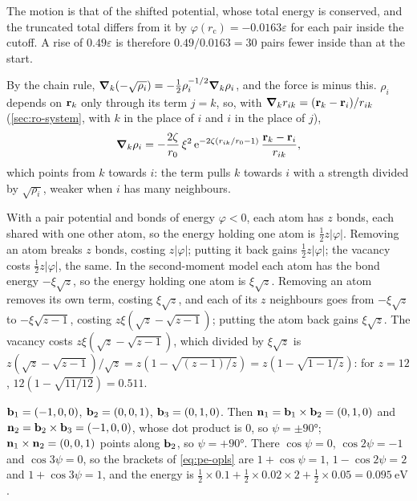 The motion is that of the shifted potential,
whose total energy is conserved, and the truncated total differs from it
by $\varphi(r_{\mathrm c}) = -0.0163\varepsilon$ for each pair inside the
cutoff. A rise of $0.49\varepsilon$ is therefore $0.49/0.0163 = 30$ pairs
fewer inside than at the start.

By the chain rule, $\bm{\nabla}_k(-\sqrt{\rho_i}) =
-\frac12\rho_i^{-1/2}\bm{\nabla}_k\rho_i$, and the force is minus this.
$\rho_i$ depends on $\bm{\mathrm{r}}_k$ only through its term $j = k$, so, with
$\bm{\nabla}_k r_{ik} = (\bm{\mathrm{r}}_k - \bm{\mathrm{r}}_i)/r_{ik}$ (\cref{sec:ro-system},
with $k$ in the place of $i$ and $i$ in the place of $j$),
\begin{equation*}
   \bm{\nabla}_k\rho_i = -\frac{2\zeta}{r_0}\,\xi^2\,\mathrm{e}^{-2\zeta(r_{ik}/r_0 - 1)}
   \,\frac{\bm{\mathrm{r}}_k - \bm{\mathrm{r}}_i}{r_{ik}} ,
\end{equation*}
which points from $k$ towards $i$: the term pulls $k$ towards $i$ with a
strength divided by $\sqrt{\rho_i}$, weaker when $i$ has many neighbours.

With a pair potential and bonds of energy
$\varphi < 0$, each atom has $z$ bonds, each shared with one other atom,
so the energy holding one atom is $\frac12 z\lvert\varphi\rvert$. Removing
an atom breaks $z$ bonds, costing $z\lvert\varphi\rvert$; putting it back
gains $\frac12 z\lvert\varphi\rvert$; the vacancy costs $\frac12 z\lvert
\varphi\rvert$, the same. In the second-moment model each atom has the
bond energy $-\xi\sqrt{z}$, so the energy holding one atom is $\xi\sqrt
z$. Removing an atom removes its own term, costing $\xi\sqrt z$, and each
of its $z$ neighbours goes from $-\xi\sqrt z$ to $-\xi\sqrt{z - 1}$,
costing $z\xi(\sqrt z - \sqrt{z - 1})$; putting the atom back gains $\xi
\sqrt z$. The vacancy costs $z\xi(\sqrt z - \sqrt{z - 1})$, which divided
by $\xi\sqrt z$ is $z(\sqrt z - \sqrt{z - 1})/\sqrt z = z(1 - \sqrt{(z -
1)/z}) = z(1 - \sqrt{1 - 1/z})$: for $z = 12$, $12(1 -
\sqrt{11/12}) = 0.511$.

$\bm{\mathrm{b}}_1 = (-1, 0, 0)$, $\bm{\mathrm{b}}_2 = (0, 0,
1)$, $\bm{\mathrm{b}}_3 = (0, 1, 0)$. Then $\bm{\mathrm{n}}_1 = \bm{\mathrm{b}}_1\times\bm{\mathrm{b}}_2 = (0,
1, 0)$ and $\bm{\mathrm{n}}_2 = \bm{\mathrm{b}}_2\times\bm{\mathrm{b}}_3 = (-1, 0, 0)$, whose dot
product is 0, so $\psi = \pm\ang{90}$; $\bm{\mathrm{n}}_1\times\bm{\mathrm{n}}_2 = (0, 0,
1)$ points along $\bm{\mathrm{b}}_2$, so $\psi = +\ang{90}$. There $\cos\psi = 0$,
$\cos2\psi = -1$ and $\cos3\psi = 0$, so the brackets of
\cref{eq:pe-opls} are $1 + \cos\psi = 1$, $1 - \cos2\psi = 2$ and $1 +
\cos3\psi = 1$, and the energy is $\frac12\times0.1 +
\frac12\times0.02\times2 + \frac12\times0.05 =
\SI{0.095}{\electronvolt}$.

